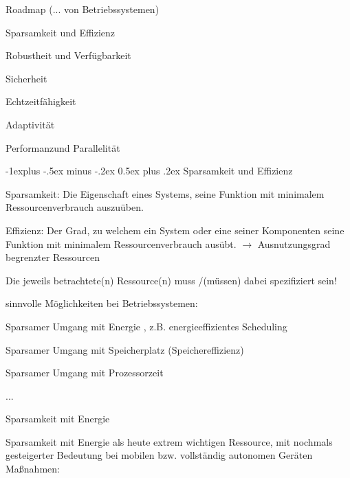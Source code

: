 \documentclass[a4paper]{article}
\makeatletter
\renewcommand{\subsection}{\@startsection{subsection}{2}{0mm}%
 {-1explus -.5ex minus -.2ex}%
 {0.5ex plus .2ex}%
 {\normalfont\normalsize\bfseries}}
\makeatother
\begin{document}
\begin{multicols}{3}
    Roadmap (... von Betriebssystemen)

    \begin{itemize*}
        \item Sparsamkeit und Effizienz
        \item Robustheit und Verfügbarkeit
        \item Sicherheit
        \item Echtzeitfähigkeit
        \item Adaptivität
        \item Performanzund Parallelität
    \end{itemize*}


    \subsection{Sparsamkeit und
        Effizienz}

    \begin{itemize*}
        \item Sparsamkeit: Die Eigenschaft eines Systems, seine Funktion mit
        minimalem Ressourcenverbrauch auszuüben.
        \item Effizienz: Der Grad, zu welchem ein System oder eine seiner
        Komponenten seine Funktion mit minimalem Ressourcenverbrauch ausübt.
        $\rightarrow$ Ausnutzungsgrad begrenzter Ressourcen
        \item Die jeweils betrachtete(n) Ressource(n) muss /(müssen) dabei
        spezifiziert sein!
        \item sinnvolle Möglichkeiten bei Betriebssystemen:
        \begin{enumerate*}

            \item Sparsamer Umgang mit Energie , z.B. energieeffizientes Scheduling
            \item Sparsamer Umgang mit Speicherplatz (Speichereffizienz)
            \item Sparsamer Umgang mit Prozessorzeit
            \item ...
        \end{enumerate*}
    \end{itemize*}

    Sparsamkeit mit Energie

    \begin{itemize*}
        \item Sparsamkeit mit Energie als heute extrem wichtigen Ressource, mit
        nochmals gesteigerter Bedeutung bei mobilen bzw. vollständig autonomen
        Geräten Maßnahmen:
    \end{itemize*}


\end{multicols}
\end{document}
